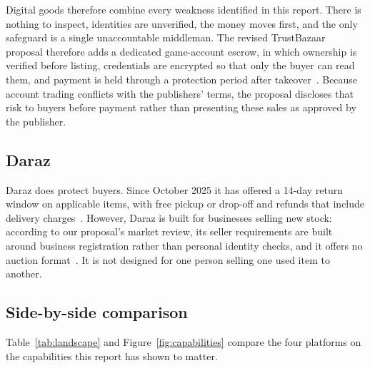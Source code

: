 Digital goods therefore combine every weakness identified in this report. There is nothing to
inspect, identities are unverified, the money moves first, and the only safeguard is a single
unaccountable middleman. The revised TrustBazaar proposal therefore adds a dedicated
game-account escrow, in which ownership is verified before listing, credentials are encrypted
so that only the buyer can read them, and payment is held through a protection period after
takeover~\cite{proposal_rev}. Because account trading conflicts with the publishers' terms, the
proposal discloses that risk to buyers before payment rather than presenting these sales as
approved by the publisher.

\subsection{Daraz}

Daraz does protect buyers. Since October 2025 it has offered a 14-day return window on
applicable items, with free pickup or drop-off and refunds that include delivery
charges~\cite{pa_daraz}. However, Daraz is built for businesses selling new stock: according to
our proposal's market review, its seller requirements are built around business registration
rather than personal identity checks, and it offers no auction format~\cite{proposal}. It is not
designed for one person selling one used item to another.

\subsection{Side-by-side comparison}

Table~\ref{tab:landscape} and Figure~\ref{fig:capabilities} compare the four platforms on the
capabilities this report has shown to matter.

